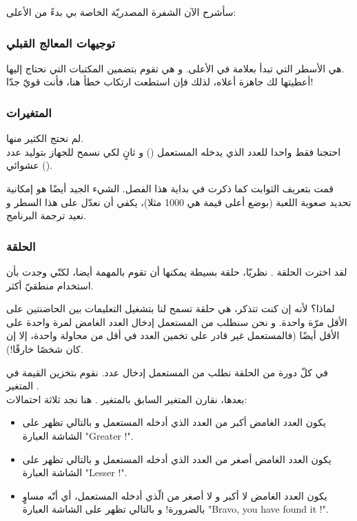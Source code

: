 سأشرح الآن الشفرة المصدريّة الخاصة بي بدءً من الأعلى:

\subsubsection{توجيهات المعالج القبلي}

هي الأسطر التي تبدأ بعلامة 
\InlineCode{\#}
في الأعلى. و هي تقوم بتضمين المكتبات التي نحتاج إليها.\\
أعطيتها لك جاهزة أعلاه، لذلك فإن استطعت ارتكاب خطأ هنا، فأنت قويّ جدّا!

\subsubsection{المتغيرات}

لم نحتج الكثير منها.\\
احتجنا فقط واحدا للعدد الذي يدخله المستعمل
() 
و ثانٍ لكي نسمح للجهاز بتوليد عدد عشوائي 
().

قمت بتعريف الثوابت كما ذكرت في بداية هذا الفصل. الشيء الجيد أيضًا هو إمكانية تحديد صعوبة اللعبة (بوضع أعلى قيمة هي 1000 مثلا)، يكفي أن نعدّل على هذا السطر و نعيد ترجمة البرنامج.

\subsubsection{الحلقة}

لقد اخترت الحلقة 
.
نظريّا، حلقة 
بسيطة يمكنها أن تقوم بالمهمة أيضا، لكنّي وجدت بأن استخدام 
منطقيّ أكثر. 

لماذا؟  لأنه إن كنت تتذكر، 
هي حلقة تسمح لنا بتشغيل التعليمات بين الحاضنتين على الأقل مرّة واحدة. و نحن سنطلب من المستعمل إدخال العدد الغامض لمرة واحدة على الأقل أيضًا (فالمستعمل غير قادر على تخمين العدد في أقل من محاولة واحدة، إلا إن كان شخصًا خارقًا!).

في كلّ دورة من الحلقة نطلب من المستعمل إدخال عدد. نقوم بتخزين القيمة في المتغير 
.\\
بعدها، نقارن المتغير السابق بالمتغير 
.
هنا نجد ثلاثة احتمالات:

\begin{itemize}
	\item يكون العدد الغامض أكبر من العدد الذي أدخله المستعمل و بالتالي تظهر على الشاشة العبارة
	"\textenglish{Greater !}".
	\item يكون العدد الغامض أصغر من العدد الذي أدخله المستعمل و بالتالي تظهر على الشاشة العبارة
	"\textenglish{Lesser !}".
	\item يكون العدد الغامض لا أكبر و لا أصغر من الّذي أدخله المستعمل، أي أنّه مساوٍ بالضرورة! و بالتالي تظهر على الشاشة العبارة
	"\textenglish{Bravo, you have found it !}".
\end{itemize}

